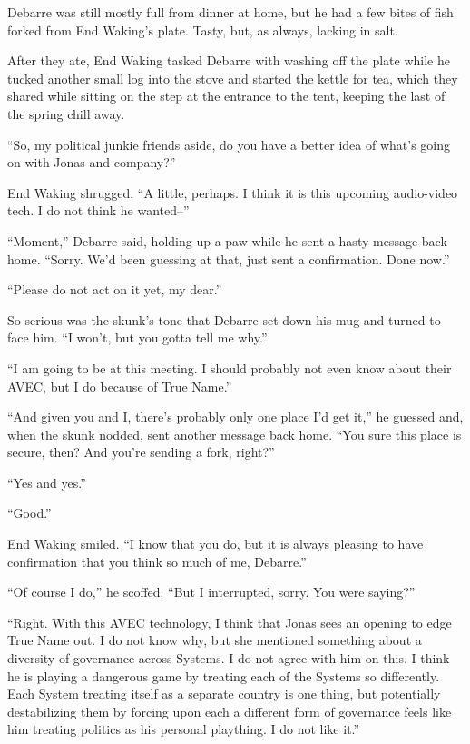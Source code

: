 Debarre was still mostly full from dinner at home, but he had a few bites of fish forked from End Waking's plate. Tasty, but, as always, lacking in salt.

After they ate, End Waking tasked Debarre with washing off the plate while he tucked another small log into the stove and started the kettle for tea, which they shared while sitting on the step at the entrance to the tent, keeping the last of the spring chill away.

``So, my political junkie friends aside, do you have a better idea of what's going on with Jonas and company?''

End Waking shrugged. ``A little, perhaps. I think it is this upcoming audio-video tech. I do not think he wanted--''

``Moment,'' Debarre said, holding up a paw while he sent a hasty message back home. ``Sorry. We'd been guessing at that, just sent a confirmation. Done now.''

``Please do not act on it yet, my dear.''

So serious was the skunk's tone that Debarre set down his mug and turned to face him. ``I won't, but you gotta tell me why.''

``I am going to be at this meeting. I should probably not even know about their AVEC, but I do because of True Name.''

``And given you and I, there's probably only one place I'd get it,'' he guessed and, when the skunk nodded, sent another message back home. ``You sure this place is secure, then? And you're sending a fork, right?''

``Yes and yes.''

``Good.''

End Waking smiled. ``I know that you do, but it is always pleasing to have confirmation that you think so much of me, Debarre.''

``Of course I do,'' he scoffed. ``But I interrupted, sorry. You were saying?''

``Right. With this AVEC technology, I think that Jonas sees an opening to edge True Name out. I do not know why, but she mentioned something about a diversity of governance across Systems. I do not agree with him on this. I think he is playing a dangerous game by treating each of the Systems so differently. Each System treating itself as a separate country is one thing, but potentially destabilizing them by forcing upon each a different form of governance feels like him treating politics as his personal plaything. I do not like it.''

